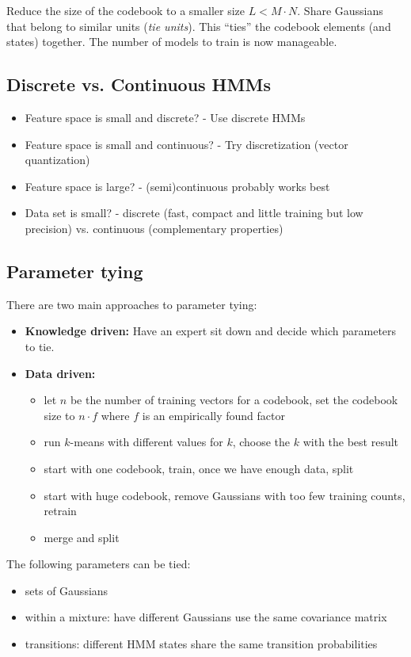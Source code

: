 Reduce the size of the codebook to a smaller size $L < M \cdot N$. Share Gaussians that belong to similar units (\textit{tie units}). This ``ties'' the codebook elements (and states) together. The number of models to train is now manageable.


\subsection{Discrete vs. Continuous HMMs}
\begin{itemize}
\item Feature space is small and discrete? - Use discrete HMMs
\item Feature space is small and continuous? - Try discretization (vector quantization)
\item Feature space is large? - (semi)continuous probably works best
\item Data set is small? - discrete (fast, compact and little training but low precision) vs. continuous (complementary properties)
\end{itemize}

\subsection{Parameter tying}

There are two main approaches to parameter tying:
\begin{itemize}
    \item \textbf{Knowledge driven:} Have an expert sit down and decide which parameters to tie.
    \item \textbf{Data driven:}
        \begin{itemize}
            \item let $n$ be the number of training vectors for a codebook, set the codebook size to $n \cdot f$ where $f$ is an empirically found factor
            \item run $k$-means with different values for $k$, choose the $k$ with the best result
            \item start with one codebook, train, once we have enough data, split
            \item start with huge codebook, remove Gaussians with too few training counts, retrain
            \item merge and split
        \end{itemize}
\end{itemize}

The following parameters can be tied:
\begin{itemize}
    \item sets of Gaussians
    \item within a mixture: have different Gaussians use the same covariance matrix
    \item transitions: different HMM states share the same transition probabilities
\end{itemize}

